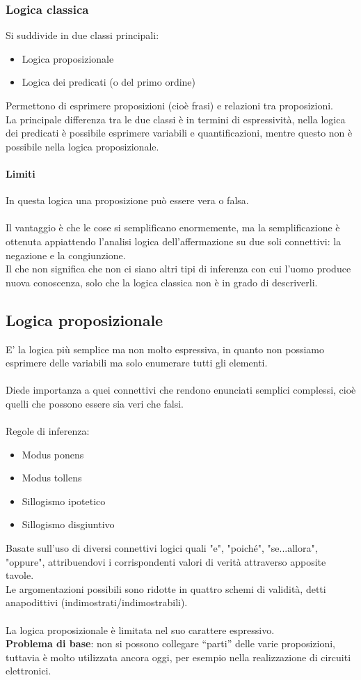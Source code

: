 \documentclass[../main.tex]{subfiles}
\begin{document}
	\subsubsection{Logica classica}
	Si suddivide in due classi principali:
	\begin{itemize}
		\item Logica proposizionale
		\item Logica dei predicati (o del primo ordine)
	\end{itemize}
	Permettono di esprimere proposizioni (cioè frasi) e relazioni tra proposizioni.\\
	La principale differenza tra le due classi è in termini di espressività, nella logica dei predicati è possibile esprimere variabili e quantificazioni, mentre questo non è possibile nella logica proposizionale.
	\paragraph{Limiti} 
	In questa logica una proposizione può essere vera o falsa.\\\\
	Il vantaggio è che le cose si semplificano enormemente, ma la semplificazione è ottenuta appiattendo l'analisi logica dell'affermazione su due soli connettivi: la negazione e la congiunzione. \\
	Il che non significa che non ci siano altri tipi di inferenza con cui l'uomo produce nuova conoscenza, solo che la logica classica non è in grado di descriverli.
	\subsection{Logica proposizionale}
	E' la logica più semplice ma non molto espressiva, in quanto non possiamo esprimere delle variabili ma solo enumerare tutti gli elementi.\\\\
	Diede importanza a quei connettivi che rendono enunciati semplici complessi, cioè quelli che possono essere sia veri che falsi.\\\\
	Regole di inferenza:
	\begin{itemize}
		\item Modus ponens
		\item Modus tollens
		\item Sillogismo ipotetico
		\item Sillogismo disgiuntivo
	\end{itemize}
	Basate sull'uso di diversi connettivi logici quali "e", "poiché", "se...allora", "oppure", attribuendovi i corrispondenti valori di verità attraverso apposite tavole.\\
	Le argomentazioni possibili sono ridotte in quattro schemi di validità, detti anapodittivi (indimostrati/indimostrabili).\\\\
	La logica proposizionale è limitata nel suo carattere espressivo.\\ \textbf{Problema di base}: non si possono collegare “parti” delle varie proposizioni, tuttavia è molto utilizzata ancora oggi, per esempio nella realizzazione di circuiti elettronici.
\end{document}
